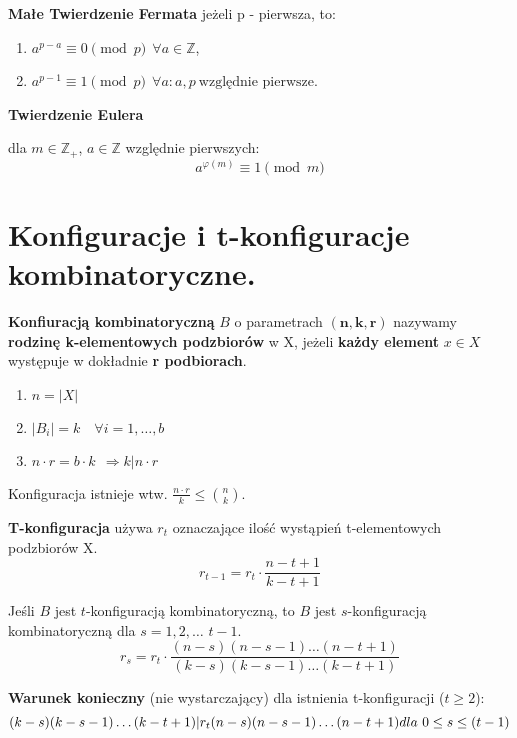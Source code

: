 \documentclass[main.tex]{subfiles}
\begin{document}
    \begin{definition}
        \textbf{Małe Twierdzenie Fermata}
        jeżeli p - pierwsza, to:

        \begin{enumerate}
            \item $a^{p-a} \equiv 0 \pmod p ~~ \forall a \in \mathbb{Z}$,
            \item $a^{p-1} \equiv 1 \pmod p ~~ \forall a : a, p ~ \text{względnie pierwsze}$.
        \end{enumerate}
    \end{definition}

    \begin{definition}
        \textbf{Twierdzenie Eulera}

        dla $m \in \mathbb{Z_{+}}$, $a \in \mathbb{Z}$ względnie pierwszych:
        \[ a^{\varphi (m)} \equiv 1 \pmod m \]
    \end{definition}


    \section{Konfiguracje i t-konfiguracje kombinatoryczne.}

    \begin{definition}
        \textbf{Konfiuracją kombinatoryczną} $B$ o parametrach $\mathbf{(n,k,r)}$ nazywamy \textbf{rodzinę k-elementowych
        podzbiorów} w X, jeżeli \textbf{każdy element} $x \in X$ występuje w dokładnie \textbf{r podbiorach}.
        \begin{enumerate}
            \item $n = |X|$
            \item $|B_i|=k \quad \forall i=1, \dots, b$
            \item $n \cdot r = b \cdot k ~~ \Rightarrow k | n\cdot r$
        \end{enumerate}
        Konfiguracja istnieje wtw. $\frac{n\cdot r}{k}\leq {n\choose k}$.


    \end{definition}

    \begin{definition}
        \textbf{T-konfiguracja} używa $r_t$ oznaczające ilość wystąpień t-elementowych podzbiorów X.
        \[r_{t-1} = r_t \cdot \frac{n-t+1}{k-t+1}\]

        Jeśli $B$ jest $t$-konfiguracją kombinatoryczną, to
        $B$ jest $s$-konfiguracją kombinatoryczną dla $s = 1, 2,\dots$ $t-1$.
        \[r_s = r_t \cdot \frac{(n-s)(n-s-1)\dots(n-t+1)}{(k-s)(k-s-1)\dots(k-t+1)}\]

        \textbf{Warunek konieczny} (nie wystarczający) dla istnienia t-konfiguracji ($t \geq 2$):
        \[(k-s)(k-s-1)\dots(k-t+1)|r_t(n-s)(n-s-1)\dots(n-t+1) \\ dla\  0\leq s \leq (t-1)\]
    \end{definition}
\end{document}
